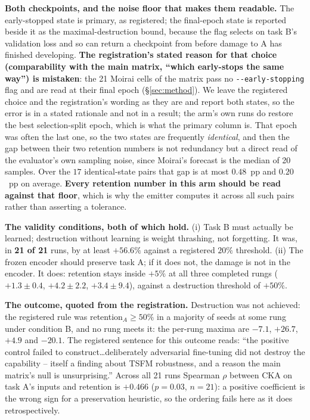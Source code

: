 \textbf{Both checkpoints, and the noise floor that makes them readable.} The
early-stopped state is primary, as registered; the final-epoch state is reported
beside it as the maximal-destruction bound, because the flag selects on task B's
validation loss and so can return a checkpoint from before damage to A has finished
developing.  \textbf{The registration's stated reason for that choice
(comparability with the main matrix, ``which early-stops the same way'') is
mistaken}: the 21 Moirai cells of the matrix pass no \texttt{-{}-early-stopping} flag and are read at their
final epoch (\S\ref{sec:method}).  We leave the registered choice and the
registration's wording as they are and report both states, so the error is in a
stated rationale and not in a result; the arm's own runs do restore the best
selection-split epoch, which is what the primary column is.  That epoch was
often the last one, so the two states are frequently \emph{identical}, and then the gap
between their two retention numbers is not redundancy but a direct read of the
evaluator's own sampling noise, since Moirai's forecast is the median of 20
samples.  Over the $17$ identical-state pairs that gap is at most $0.48$~pp and
$0.20$~pp on average.  \textbf{Every retention number in this arm should be read
against that floor}, which is why the emitter computes it across all such pairs
rather than asserting a tolerance.

\textbf{The validity conditions, both of which hold.} (i) Task B must actually be
learned; destruction without learning is weight thrashing, not forgetting. It
was, in \textbf{21 of 21} runs, by at least $+56.6\%$ against a registered $20\%$
threshold. (ii) The frozen encoder should preserve task A; if it does not, the
damage is not in the encoder. It does: retention stays inside $+5\%$ at all three
completed rungs ($+1.3\pm0.4$, $+4.2\pm2.2$, $+3.4\pm9.4$), against a destruction
threshold of $+50\%$.

\textbf{The outcome, quoted from the registration.} Destruction was not achieved:
the registered rule was retention$_A\!\geq\!50\%$ in a majority of seeds at some
rung under condition B, and no rung meets it: the per-rung maxima are $-7.1$,
$+26.7$, $+4.9$ and $-20.1$.  The registered sentence for this outcome reads:
``the positive control failed to construct\ldots deliberately adversarial
fine-tuning did not destroy the capability -- itself a finding about TSFM
robustness, and a reason the main matrix's null is unsurprising.''  Across all 21
runs Spearman $\rho$ between CKA on task A's inputs and retention is $+0.466$
($p{=}0.03$, $n{=}21$): a positive coefficient is the wrong sign for a
preservation heuristic, so the ordering fails here as it does retrospectively.

